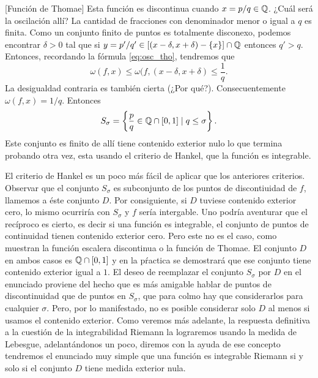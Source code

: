 \begin{ejemplo}{}[Función de Thomae] Esta función es discontinua cuando $x=p/q\in\mathbb{Q}$. ¿Cuál será la oscilación allí? La cantidad de fracciones con denominador menor o igual a $q$ es finita.  Como un conjunto finito de puntos es totalmente disconexo,  podemos encontrar $\delta>0$ tal que si $y=p'/q'\in \left[(x-\delta,x+\delta)-\{x\}\right]\cap \mathbb{Q}$ entonces $q'>q$. Entonces, recordando la fórmula \eqref{eq:osc_tho}, tendremos que 
$$\omega(f,x)\leq \omega(f, (x-\delta,x+\delta)\leq \frac{1}{q}.$$
La desigualdad contraria es también cierta (¿Por qué?). Consecuentemente $\omega(f,x)=1/q$. Entonces
\[
 S_\sigma=\left\{\frac{p}{q}\in \mathbb{Q}\cap[0,1]\mid q\leq\sigma\right\}.
\]
Este conjunto es finito de allí tiene contenido exterior nulo lo que termina probando otra vez, esta usando el criterio de Hankel, que la función es integrable.
 
\end{ejemplo}



El criterio de Hankel es un poco más fácil de aplicar que los anteriores criterios. Observar que el conjunto $S_\sigma$ es subconjunto de los puntos de discontiuidad de $f$, llamemos a éste conjunto $D$. Por consiguiente, si $D$ tuviese contenido  exterior cero, lo mismo ocurriría con $S_\sigma$ y $f$ sería intergable. Uno podría aventurar que el recíproco es cierto, es decir si una función es integrable, el conjunto de puntos de continuidad tienen contenido exterior cero.  Pero este  no es el caso, como muestran la función escalera discontinua o la función de Thomae. El conjunto $D$ en ambos casos es $\mathbb{Q}\cap [0,1]$ y en la pŕactica se demostrará que ese conjunto tiene contenido exterior igual a $1$. El deseo de reemplazar el conjunto $S_\sigma$ por $D$ en el enunciado proviene del hecho que es más amigable hablar de puntos de discontinuidad que de puntos en $S_\sigma$, que para colmo hay que considerarlos para cualquier $\sigma$. Pero, por lo manifestado, no es posible considerar solo $D$ al menos si usamos el contenido exterior. Como veremos más adelante, la respuesta definitiva a la cuestión de la integrabilidad Riemann la lograremos usando la medida de Lebesgue, adelantándonos un poco, diremos con la ayuda de ese concepto tendremos el enunciado muy simple  que una función es integrable Riemann si y solo si el conjunto $D$ tiene medida exterior nula. 



